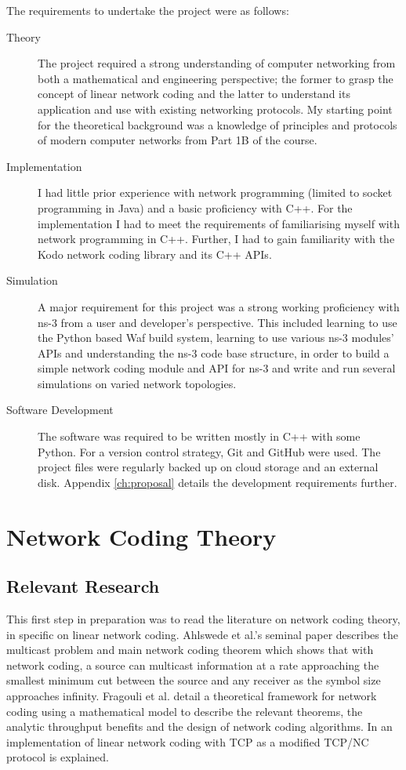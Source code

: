\documentclass[12pt,a4paper,twoside,openright]{report}
\begin{document}
The requirements to undertake the project were as follows:
\begin{description}
	\item[Theory] The project required a strong understanding of computer networking from both a mathematical and engineering perspective; the former to grasp the concept of linear network coding and the latter to understand its application and use with existing networking protocols. My starting point for the theoretical background was a knowledge of principles and protocols of modern computer networks from Part 1B of the course. 
	\item[Implementation] I had little prior experience with network programming (limited to socket programming in Java) and a basic proficiency with C++. For the implementation I had to meet the requirements of familiarising myself with network programming in C++. Further, I had to gain familiarity with the Kodo network coding library and its C++ APIs. 
	\item[Simulation] A major requirement for this project was a strong working proficiency with ns-3 from a user and developer's perspective. This included learning to use the Python based Waf build system, learning to use various ns-3 modules' APIs and understanding the ns-3 code base structure, in order to build a simple network coding module and API for ns-3 and write and run several simulations on varied network topologies.
	\item[Software Development] The software was required to be written mostly in C++ with some Python. For a version control strategy, Git and GitHub were used. The project files were regularly backed up on cloud storage and an external disk. Appendix \ref{ch:proposal} details the development requirements further.
\end{description}

\section{Network Coding Theory} \label{sec:nctheory}

\subsection{Relevant Research}

This first step in preparation was to read the literature on network coding theory, in specific on linear network coding. Ahlswede et al.\cite{ahlswede}'s seminal paper describes the multicast problem and main network coding theorem which shows that with network coding, a source can multicast information at a rate approaching the smallest minimum cut between the source and any receiver as the symbol size approaches infinity. Fragouli et al.\cite{nc-fund} detail a theoretical framework for network coding using a mathematical model to describe the relevant theorems, the analytic throughput benefits and the design of network coding algorithms. In \cite{tcpnc} an implementation of linear network coding with TCP as a modified TCP/NC protocol is explained.
\end{document}
